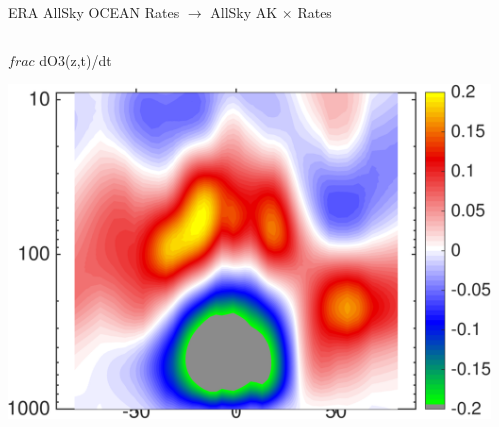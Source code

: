 \documentclass[10pt,t]{beamer}
\begin{document}
\begin{frame}{ERA AllSky OCEAN Rates $\rightarrow$ AllSky AK $\times$ Rates}
\vspace{-0.25in}

\begin{columns}
\begin{column}{0.45\columnwidth}
\begin{block}{\footnotesize $frac$ dO3(z,t)/dt}
\vspace{-0.1in}
\begin{center}
\includegraphics[width=\linewidth]{Figs/CloudAnom/Desc/ak_x_ERAo3rates.png}
\end{center}
\end{block}
\end{column}

\begin{column}{0.45\columnwidth}

\end{column}
\end{columns}
\end{frame}

\end{document}
